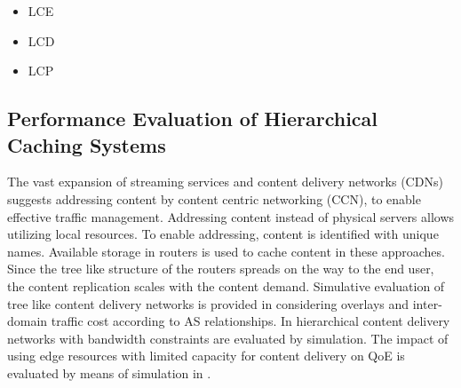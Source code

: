 \begin{itemize}
  \item LCE
  \item LCD
  \item LCP
\end{itemize}

\subsection{Performance Evaluation of Hierarchical Caching Systems}
The vast expansion of streaming services and content delivery networks (CDNs) suggests addressing content by content centric networking (CCN), to enable effective traffic management.
Addressing content instead of physical servers allows utilizing local resources.
To enable addressing, content is identified with unique names.
Available storage in routers is used to cache content in these approaches.
Since the tree like structure of the routers spreads on the way to the end user, the content replication scales with the content demand.
Simulative evaluation of tree like content delivery networks is provided in \cite{lareida2015augmenting} considering overlays and inter-domain traffic cost according to AS relationships.
In \cite{applegate2010optimal} hierarchical content delivery networks with bandwidth constraints are evaluated by simulation. The impact of using edge resources with limited capacity for content delivery on QoE is evaluated by means of simulation in \cite{info3-inproceedings-2015-530}.

